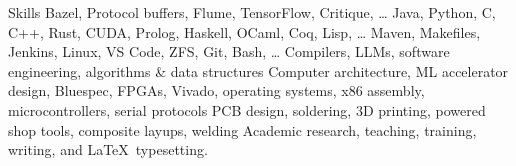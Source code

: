 
\begin{rubric}{Skills}
	Bazel, Protocol buffers, Flume, TensorFlow, Critique, \dots
{}
	Java, Python, C, C++, Rust, CUDA, Prolog, Haskell, OCaml, Coq, Lisp, \ldots
\entry*[Tools]
	Maven, Makefiles, Jenkins, Linux, VS Code, ZFS, Git, Bash, \ldots
\entry*[CS Principles] Compilers, LLMs, software engineering, algorithms \& data structures
	Computer architecture, ML accelerator design, Bluespec, FPGAs,
	Vivado, operating systems, x86 assembly, microcontrollers, serial protocols
\entry*[Hardware]
	PCB design, soldering, 3D printing, powered shop tools, composite layups, welding
\entry*[Misc.]
	Academic research, teaching, training, writing, and \LaTeX\ typesetting.
\end{rubric}
